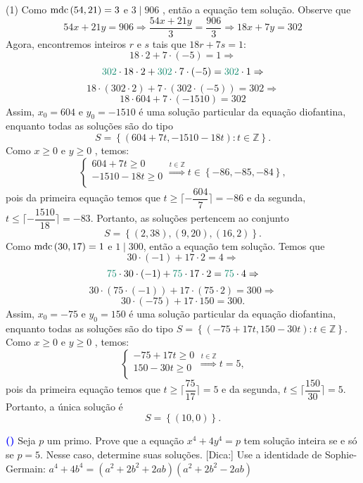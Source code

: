 \documentclass[12pt, a4paper]{article}
\newcommand{\mdc}{{\rm mdc}}
\newcommand{\negrito}[1]{\mbox{\boldmath{$#1$}}}
\newcommand{\Z}{\mathbb{Z}}
\newcounter{exercicio}[section]
\newenvironment{exercicio}[1][]{\refstepcounter{exercicio}\par\medskip
 \textcolor{blue}{\bf(\theexercicio)} \rmfamily}{\medskip }
\newcommand{\itens}[1]{\begin{tasks}[label={(tsk[a])},label-width=3.6ex, label-format = {\bfseries}, column-sep = {0pt}](1) #1\end{tasks}}
\newcommand{\alt}[1]{\textcolor{Floresta}{$\negrito{(#1)} $}}
\begin{document}
\begin{solution}
\itens{
	\task[\alt{a}] Como $\mdc   \left( 54, 21 \right) =3 $  e  $ 3\mid906 $ , então a equação tem solução. Observe que
    $$ 54x+21y=906 \Rightarrow \dfrac{54x+21y}{3}=\dfrac{906}{3} \Rightarrow  18x+7y=302 $$ 
Agora, encontremos inteiros $r$ e $s$ tais que $18r + 7s = 1:$ 
    $$ 18\cdot2+7\cdot \left( -5 \right) =1 \Rightarrow$$
    $$ \textcolor{PineGreen}{302} \cdot 18\cdot2+ \textcolor{PineGreen}{302} \cdot 7\cdot \left( -5 \right) =\textcolor{PineGreen}{302} \cdot 1 \Rightarrow$$
    $$  18\cdot(302 \cdot 2)+  7\cdot \left( 302 \cdot (-5) \right) =302 \Rightarrow$$
    $$ 18\cdot604+7\cdot \left( -1510 \right) =302 $$ 
    Assim, $ x_{0}=604 $  e  $ y_{0}=-1510 $  é uma solução particular da equação diofantina, enquanto todas as soluções são do tipo  \[ S= \left\{  \left( 604+7t,-1510-18t \right) :t \in \Z \right\}  .\]
    Como  $ x \geq 0 $  e  $ y \geq 0 $ , temos:
    $$  \left\{ \begin{array}{c}
	604+7t \geq 0\\
	-1510-18t \geq 0\\
	\end{array}\right.\stackrel{t \in \Z}{\Longrightarrow}  t \in  \left\{ -86,-85,-84 \right\}, $$ 
	pois da primeira equação temos que $t \geq \lceil - \dfrac{604}{7} \rceil = -86$ e da segunda, $t \leq \lceil -\dfrac{1510}{18} \rceil = -83.$
    Portanto, as soluções pertencem ao conjunto  \[ S= \left\{  \left( 2, 38 \right) , \left( 9, 20 \right) , \left( 16, 2\right)  \right\}.\]
	\task[\alt{b}] Como $\mdc \left( 30, 17 \right) =1 $  e  $ 1\mid300 $, então a equação tem solução.
	Temos que
    $$ 30\cdot \left( -1 \right) +17\cdot2=4 \Rightarrow$$ 
    $$ \textcolor{PineGreen}{75} \cdot 30\cdot \left( -1 \right) + \textcolor{PineGreen}{75} \cdot  17\cdot2= \textcolor{PineGreen}{75} \cdot  4 \Rightarrow$$
      $$  30\cdot \left(75 \cdot (-1)\right) +  17\cdot(75 \cdot 2) = 300 \Rightarrow$$  
    $$30\cdot \left( -75 \right) +17\cdot150=300.$$ 
    Assim,  $ x_{0}=-75 $  e  $ y_{0}=150 $  é uma solução particular da equação diofantina, enquanto todas as soluções são do tipo  $ S= \left\{  \left( -75+17t,150-30t \right) :t \in \Z \right\}  $.
    Como  $ x \geq 0 $  e  $ y \geq 0 $ , temos:
    $$  \left\{ \begin{array}{c}
	-75+17t \geq 0\\
	150-30t \geq 0\\
	\end{array}\right. \stackrel{t \in \Z}{\Longrightarrow} t=5, $$ 
	pois da primeira equação temos que $t \geq \lceil  \dfrac{75}{17} \rceil = 5$ e da segunda, $t \leq \lceil \dfrac{150}{30} \rceil = 5.$ 
    Portanto, a única solução é  \[ S= \left\{  \left( 10, 0 \right)  \right\}.\]
	}

\end{solution}
	\begin{exercicio}
	Seja $p$ um primo. Prove que a equação $x^4+4y^4=p$ tem solução inteira se e só se $p=5$. Nesse caso, determine suas soluções.
	\textsf{[Dica:]} Use a identidade de Sophie-Germain: $a^4 + 4b^4 = (a^2 + 2b^2 + 2ab)(a^2 + 2b^2 - 2ab)$
	\end{exercicio}
	
\end{document}
